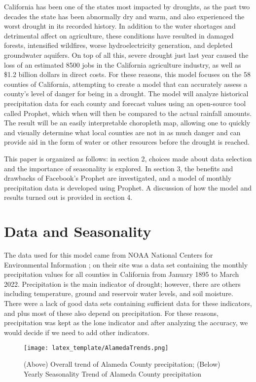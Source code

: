 \documentclass{article}
\begin{document}
California has been one of the states most impacted by droughts, as the past two decades the state has been abnormally dry and warm, and also experienced the worst drought in its recorded history. In addition to the water shortages and detrimental affect on agriculture, these conditions have resulted in damaged forests, intensified wildfires, worse hydroelectricity generation, and depleted groundwater aquifers. On top of all this, severe drought just last year caused the loss of an estimated 8500 jobs in the California agriculture industry, as well as \$1.2 billion dollars in direct costs. For these reasons, this model focuses on the 58 counties of California, attempting to create a model that can accurately assess a county's level of danger for being in a drought. The model will analyze historical precipitation data for each county and forecast values using an open-source tool called Prophet, which when will then be compared to the actual rainfall amounts. The result will be an easily interpretable choropleth map, allowing one to quickly and visually determine what local counties are not in as much danger and can provide aid in the form of water or other resources before the drought is reached. 

This paper is organized as follows: in section 2, choices made about data selection and the importance of seasonality is explored. In section 3, the benefits and drawbacks of Facebook's Prophet are investigated, and a model of monthly precipitation data is developed using Prophet. A discussion of how the model and results turned out is provided in section 4.


\section{Data and Seasonality}
The data used for this model came from NOAA National Centers for Environmental Information \cite{dataset}; on their site was a data set containing the monthly precipitation values for all counties in California from January 1895 to March 2022. Precipitation is the main indicator of drought; however, there are others including temperature, ground and reservoir water levels, and soil moisture. There were a lack of good data sets containing sufficient data for these indicators, and plus most of these also depend on precipitation. For these reasons, precipitation was kept as the lone indicator and after analyzing the accuracy, we would decide if we need to add other indicators. 


\begin{figure}[htp]
    \centering
    \texttt{[image: latex\_template/AlamedaTrends.png]}
    \caption{(Above) Overall trend of Alameda County precipitation; (Below) Yearly Seasonality Trend of Alameda County precipitation}
    \label{fig:galaxy}
\end{figure}
\end{document}
